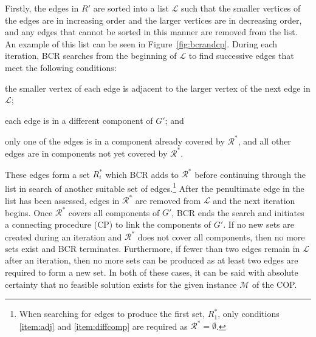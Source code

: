 \documentclass[authoryear]{elsarticle}
\begin{document}
Firstly, the edges in $R'$ are sorted into a list $\mathcal{L}$ such that the smaller vertices of the edges are in increasing order and the larger vertices are in decreasing order, and any edges that cannot be sorted in this manner are removed from the list. An example of this list can be seen in Figure~\ref{fig:bcrandcp}. During each iteration, BCR searches from the beginning of $\mathcal{L}$ to find successive edges that meet the following conditions:
\begin{enumerate*}[label={(\roman*)}]
	\item the smaller vertex of each edge is adjacent to the larger vertex of the next edge in $\mathcal{L}$;\label{item:adj}
	\item each edge is in a different component of $G'$; \label{item:diffcomp} and
	\item only one of the edges is in a component already covered by $\mathcal{R}^*$, and all other edges are in components not yet covered by $\mathcal{R}^*$.\label{item:overlap}
\end{enumerate*} 
These edges form a set $R^*_i$ which BCR adds to $\mathcal{R}^*$ before continuing through the list in search of another suitable set of edges.\footnote{When searching for edges to produce the first set, $R^*_1$, only conditions \ref{item:adj} and \ref{item:diffcomp} are required as $\mathcal{R}^* = \emptyset$.} After the penultimate edge in the list has been assessed, edges in $\mathcal{R}^*$ are removed from $\mathcal{L}$ and the next iteration begins. Once $\mathcal{R}^*$ covers all components of $G'$, BCR ends the search and initiates a connecting procedure (CP) to link the components of $G'$. If no new sets are created during an iteration and $\mathcal{R}^*$ does not cover all components, then no more sets exist and BCR terminates. Furthermore, if fewer than two edges remain in $\mathcal{L}$ after an iteration, then no more sets can be produced as at least two edges are required to form a new set. In both of these cases, it can be said with absolute certainty that no feasible solution exists for the given instance $\mathcal{M}$ of the COP.
\end{document}
